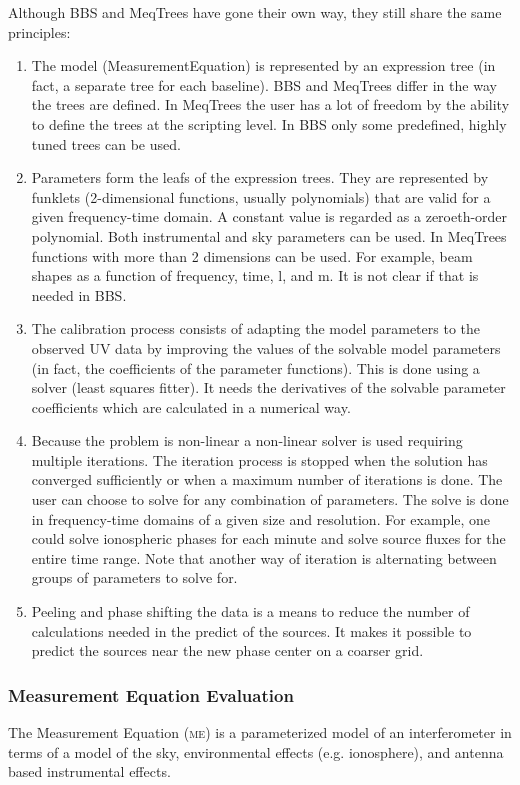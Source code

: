 \documentclass[10pt]{lofar}
\newcommand{\me}{\textsc{me}\xspace}
\begin{document}
Although BBS and MeqTrees have gone their own way, they still share the same principles:
\begin{enumerate}
\item The model (MeasurementEquation) is represented by an expression tree (in fact, a separate tree for each baseline). BBS and MeqTrees differ in the way the trees are defined. In MeqTrees the user has a lot of freedom by the ability to define the trees at the scripting level. In BBS only some predefined, highly tuned trees can be used.
\item Parameters form the leafs of the expression trees. They are represented by funklets (2-dimensional functions, usually polynomials) that are valid for a given frequency-time domain. A constant value is regarded as a zeroeth-order polynomial. Both instrumental and sky parameters can be used.
In MeqTrees functions with more than 2 dimensions can be used. For example, beam shapes as a function of frequency, time, l, and m. It is not clear if that is needed in BBS.
\item The calibration process consists of adapting the model parameters to the observed UV data by improving the values of the solvable model parameters (in fact, the coefficients of the parameter functions). This is done using a solver (least squares fitter). It needs the derivatives of the solvable parameter coefficients which are calculated in a numerical way.
\item Because the problem is non-linear a non-linear solver is used requiring multiple iterations. The iteration process is stopped when the solution has converged sufficiently or when a maximum number of iterations is done.
The user can choose to solve for any combination of parameters. The solve is done in frequency-time domains of a given size and resolution. For example, one could solve ionospheric phases for each minute and solve source fluxes for the entire time range.
Note that another way of iteration is alternating between groups of parameters to solve for.
\item Peeling and phase shifting the data is a means to reduce the number of calculations needed in the predict of the sources. It makes it possible to predict the sources near the new phase center on a coarser grid.
\end{enumerate}

\subsubsection{Measurement Equation Evaluation}
\label{subsubsec:design-me-evaluation}
The Measurement Equation (\me) \cite{LOFAR-ASTRON-ADD-015} is a parameterized model of an interferometer in terms of a model of the sky, environmental effects (e.g. ionosphere), and antenna based instrumental effects.
\end{document}
